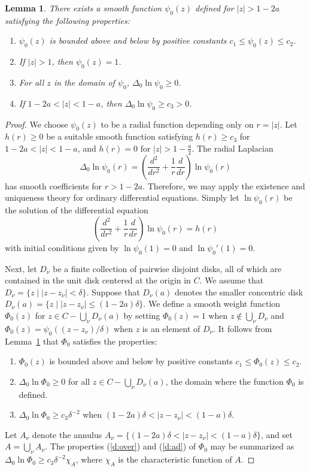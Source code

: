 \documentclass{article}
\newtheorem{lem}[thm]{Lemma}
\theoremstyle{definition}
\theoremstyle{remark}
\newcommand{\lemref}[1]{Lemma~\ref{#1}}
\newcommand{\envert}[1]{\left\lvert#1\right\rvert}
\let\abs=\envert
\begin{document}
\begin{lem}\label{limbog} There exists a smooth function $\psi_0(z)$
defined for $\abs{z}>1-2a$ satisfying the following properties\textup{:}
\begin{enumerate}
\renewcommand{\labelenumi}{(\roman{enumi})}
\item $\psi_0(z)$ is bounded above and below by positive constants
$c_1\leq \psi_0(z)\leq c_2$.
\item If $\abs{z}>1$, then $\psi_0(z)=1$.
\item For all $z$ in the domain of $\psi_0$, $\Delta_0\ln \psi_0\geq 0$.
\item If $1-2a<\abs{z}<1-a$, then $\Delta_0\ln \psi_0\geq
c_3>0$.
\end{enumerate}
\end{lem}

\begin{proof}
We choose $\psi_0(z)$ to be a radial function depending only on $r=\abs{z}$.
Let $h(r)\geq 0$ be a suitable smooth function satisfying $h(r)\geq c_3$
for $1-2a<\abs{z}<1-a$, and $h(r)=0$ for $\abs{z}>1-\tfrac a2$. The radial
Laplacian
\[\Delta_0\ln\psi_0(r)=\left(\frac {d^2}{dr^2}+\frac
1r\frac d{dr}\right)\ln\psi_0(r)\]
has smooth coefficients for $r>1-2a$. Therefore, we may
apply the existence and uniqueness theory for ordinary differential
equations. Simply let $\ln \psi_0(r)$ be the solution of the differential
equation
\[\left(\frac{d^2}{dr^2}+\frac 1r\frac d{dr}\right)\ln \psi_0(r)=h(r)\]
with initial conditions given by $\ln \psi_0(1)=0$ and
$\ln\psi_0'(1)=0$.

Next, let $D_\nu$ be a finite collection of pairwise disjoint disks,
all of which are contained in the unit disk centered at the origin in
$C$. We assume that $D_\nu=\{z\mid \abs{z-z_\nu}<\delta\}$. Suppose that
$D_\nu(a)$ denotes the smaller concentric disk $D_\nu(a)=\{z\mid
\abs{z-z_\nu}\leq (1-2a)\delta\}$. We define a smooth weight function
$\Phi_0(z)$ for $z\in C-\bigcup_\nu D_\nu(a)$ by setting $\Phi_
0(z)=1$ when $z\notin \bigcup_\nu D_\nu$ and $\Phi_
0(z)=\psi_0((z-z_\nu)/\delta)$ when $z$ is an element of $D_\nu$. It
follows from \lemref{limbog} that $\Phi_ 0$ satisfies the properties:
\begin{enumerate}
\renewcommand{\labelenumi}{(\roman{enumi})}
\item \label{boundab}$\Phi_ 0(z)$ is bounded above and below by
positive constants $c_1\leq \Phi_ 0(z)\leq c_2$.
\item \label{d:over}$\Delta_0\ln\Phi_ 0\geq 0$ for all
$z\in C-\bigcup_\nu D_\nu(a)$,
the domain where the function $\Phi_ 0$ is defined.
\item \label{d:ad}$\Delta_0\ln\Phi_ 0\geq c_3\delta^{-2}$
when $(1-2a)\delta<\abs{z-z_\nu}<(1-a)\delta$.
\end{enumerate}
Let $A_\nu$ denote the annulus $A_\nu=\{(1-2a)\delta<\abs{z-z_\nu}<(1-a)
\delta \}$, and set $A=\bigcup_\nu A_\nu$. The
properties (\ref{d:over}) and (\ref{d:ad}) of $\Phi_ 0$
may be summarized as $\Delta_0\ln \Phi_ 0\geq c_3\delta^{-2}\chi_A$,
where $\chi _A$ is the characteristic function of $A$.
\end{proof}
\end{document}
